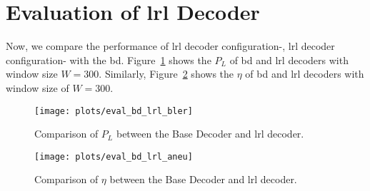 
\section{Evaluation of \texorpdfstring{\acrlong{lrl}}{LRL} Decoder}
Now, we compare the performance of \gls{lrl} decoder configuration-, \gls{lrl} decoder configuration- with the \gls{bd}. Figure~\ref{fig:eval_bd_lrl_bler} shows the $P_L$ of \gls{bd} and \gls{lrl} decoders with window size $W=300$. Similarly, Figure~\ref{fig:eval_bd_lrl_aneu} shows the $\eta$ of \gls{bd} and \gls{lrl} decoders with window size of $W=300$.
\begin{figure}[htbp]
  \centering
  \texttt{[image: plots/eval\_bd\_lrl\_bler]}
  \caption[Comparison of \acrshort{bler} between the Base Decoder and \acrshort{lrl} decoder.]{Comparison of $P_L$ between the Base Decoder and \gls{lrl} decoder.}
  \label{fig:eval_bd_lrl_bler}
\end{figure}
\begin{figure}[htbp]
  \centering
  \texttt{[image: plots/eval\_bd\_lrl\_aneu]}
  \caption[Comparison of \acrshort{aneu} between the Base Decoder and \acrshort{lrl} decoder.]{Comparison of $\eta$ between the Base Decoder and \gls{lrl} decoder.}
  \label{fig:eval_bd_lrl_aneu}
\end{figure}

